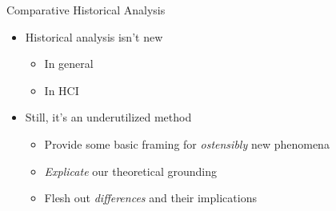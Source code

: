 \documentclass[presentation]{subfiles}
\begin{document}
\begin{frame}{Comparative Historical Analysis}
\begin{itemize}
  \item Historical analysis isn't new
  \begin{itemize}
    \item In general\\
    \scriptsize{
      \textcite{rosenberg1994exploring,rosenberg1982inside}
    }
    \item In HCI\\
    \scriptsize{
      \textcite{Wyche2006,bodker1993historical}
    }
  \end{itemize}
  \item Still, it's an underutilized method
  \begin{itemize}
    \item Provide some basic framing for \emph{ostensibly} new phenomena
    \item \emph{Explicate} our theoretical grounding
    \item Flesh out \emph{differences} and their implications
  \end{itemize}
\end{itemize}
\end{frame}



\onlyinsubfile{
  \printbibliography{}
}
\end{document}

